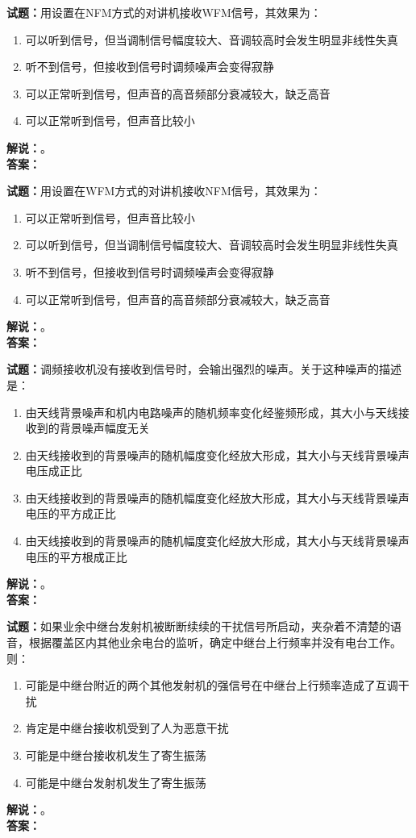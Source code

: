 \documentclass{ctexbook}
\begin{document}
\bigskip

\noindent\textbf{试题：}用设置在NFM方式的对讲机接收WFM信号，其效果为：
\begin{enumerate}[leftmargin=3em]
  \item 可以听到信号，但当调制信号幅度较大、音调较高时会发生明显非线性失真
  \item 听不到信号，但接收到信号时调频噪声会变得寂静
  \item 可以正常听到信号，但声音的高音频部分衰减较大，缺乏高音
  \item 可以正常听到信号，但声音比较小
\end{enumerate}
\noindent\textbf{解说：}\textbf{}。\\\noindent\textbf{答案：}

\bigskip

\noindent\textbf{试题：}用设置在WFM方式的对讲机接收NFM信号，其效果为：
\begin{enumerate}[leftmargin=3em]
  \item 可以正常听到信号，但声音比较小
  \item 可以听到信号，但当调制信号幅度较大、音调较高时会发生明显非线性失真
  \item 听不到信号，但接收到信号时调频噪声会变得寂静
  \item 可以正常听到信号，但声音的高音频部分衰减较大，缺乏高音
\end{enumerate}
\noindent\textbf{解说：}\textbf{}。\\\noindent\textbf{答案：}

\bigskip

\noindent\textbf{试题：}调频接收机没有接收到信号时，会输出强烈的噪声。关于这种噪声的描述是：
\begin{enumerate}[leftmargin=3em]
  \item 由天线背景噪声和机内电路噪声的随机频率变化经鉴频形成，其大小与天线接收到的背景噪声幅度无关
  \item 由天线接收到的背景噪声的随机幅度变化经放大形成，其大小与天线背景噪声电压成正比
  \item 由天线接收到的背景噪声的随机幅度变化经放大形成，其大小与天线背景噪声电压的平方成正比
  \item 由天线接收到的背景噪声的随机幅度变化经放大形成，其大小与天线背景噪声电压的平方根成正比
\end{enumerate}
\noindent\textbf{解说：}\textbf{}。\\\noindent\textbf{答案：}

\bigskip

\noindent\textbf{试题：}如果业余中继台发射机被断断续续的干扰信号所启动，夹杂着不清楚的语音，根据覆盖区内其他业余电台的监听，确定中继台上行频率并没有电台工作。则：
\begin{enumerate}[leftmargin=3em]
  \item 可能是中继台附近的两个其他发射机的强信号在中继台上行频率造成了互调干扰
  \item 肯定是中继台接收机受到了人为恶意干扰
  \item 可能是中继台接收机发生了寄生振荡
  \item 可能是中继台发射机发生了寄生振荡
\end{enumerate}
\noindent\textbf{解说：}\textbf{}。\\\noindent\textbf{答案：}
\end{document}
